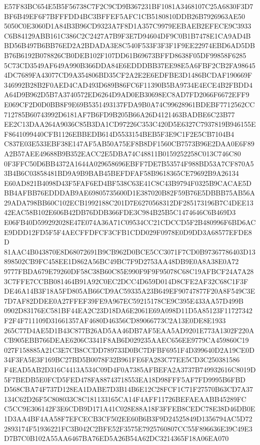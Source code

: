 \documentclass[UTF8,fontset=fandol,zihao=-4,a4paper]{ctexart}
\begin{document}
{{E57F83BC654E5B5F56738C7F2C9CD9B367231BF1081A3468107C25A6830F3D7BF6B49EF6F7BFFFDD4BC3BFFEF5AFC1CB5180810DDB26B7926963AE50
5050C0E3060D1A84B3B96CD9323A7F8D1A357C9979EEBAEB2EFECE9C3933C6B84129ABB161C386C2C2427A7B9F3E7D94604DF9C0B1B7478E1CA9AD4B
BD56B497B6BB76ED2A2BDADA3E8C540F533F3F3F1F9EE22974EBD6AD5DBB76B6192B078826CB0DEB102F107DD61B69673BFFD8638F05DF99858F6285
5C73CD3549AF649A990B366DDA84E6EDDDBB37EE98E5A6FBF2CB2FA986454DC7689FA43077CD9A354806BD35CF2A2E2E6EDFBE3D1486BCDAF190669F
346992B28B2F0AED4CAD493D689B86FC6F11390B5BA9734E4ECE4B2FBDD4A64D9B962D5B7A3740572ED6264D9AD0EB30698EC8AD7FD2066F6672EFF9
E069CF2D0D0BB8F9E69B5351493137FDA9B0A74C99628961BDEBF7712562CC712785B60743992D6181AF7B6FD9B205B66A26D4121463BADBE6C23B77
EE2C13DAA264A9036C85B3DA1CD97226C353C420D5E6327C7937819B946155EF8641099440CFB1126EBBEDB614D5533154BEB5F3E9C1F2E5CB7104B4
C837E03E533EBF38E147AF5AB50A75EF8B8DF1560CB7573B96E2DAA0E6F89A2B57AEE49688B9B352EACC2E5DBA74C48811B0159252258C013C746C80
0F3FFC50D6BB4372A1644A029658696EBFF7DE7B53574F988BD53A7CF870A53B4B6C03858481BD9A9B9BAB45BEFDFAF58B9618365CE79692B9A26134
E60AD821B4098D43F5FAF6ED4BF538C63E41C8C43B9794F0325B9CACAE5DBB4AFBB76EDDDAB9AE69805735600D1E387020B82F59B76E5DBBB75AB56A
29ADA798BB60C102ECB1992188C201D7E6270568312DF285173196B7C4DEE1342EAC58B102E606B42DB76DDB366FDE3C984B25B5C1474646C6B469D3
E06FB40D599292028E47E074A36A71C09534CC21CDCCD5F2B480996F6BD6ACE9DDD12FD5F5F4AECFFDFCF3CFB1CDD029F0978E0D9DD3A68577EFDE8D
81AAC4B043870E8D68072691B9CB962D0BCE5CC3071F7CD0B97367786403D13898502CB9FC458EE1D862A56BC49BC7F9D2753AA48DB9E0A8A38E0A72
9777FBDA679E79260DF58C38B60C85E990F9F9F95078C68C19AFBCF24A7A283C7FFE7CCBB081464B91A92C0EC2DCC4D659D014D8CFE2AF32C68C1F3F
DE46A14B3F18A5FD805AB66CD9AC59335A23B649EF90747877F20A8F549C3E7D7AF82DDEE0A27FFEF39FE9A967EC59215178CE9C395E433AA57D499B
0902D83176EC581BF44EA2C23D18DA6E2061E69A098D11D5A85123F11727342F2F4F711109D31661357AF4680D46356CD89066773C2A13E0DE8E1933
265C77D4AE5D1B43C877B26AD5AA46DB7AF5EAA5AD9201E773A1302F220ACB905EBB766DEAE6206C3341F8AB6D029235AAEC656EE9779CA459860C19
027F158885A21C3E7CB8CCDD789733D0BC7DFBF6951F4D399640D2A19CE0D34F3FA5E3F169BC27BD5B0078F32B961FE6FA283C77EE5CD3C250381586
F4EAD5AB2D316C4413A534C09D4F0A7385AFBEFA2A3737B749932616C8019D5F7BEDB5E0FCD5FED478FA88743718553EA18D98FFF5AF7FD9995B6FBD
D568CBA74F737D128EA1DABE7D3B14B6E12C28FCF1C71F27570B63CD7A37134C62D26F5C808033C8C181133165CA14F4AFF11726BEFAEAABB45289FC
C5CC9E306142F3E6CDB9D171A41C028E88A18F3FFEB8CEDC78E38D46DB0E1D3AA4BF4AA58F7EFCECB3CF502EE60B6B3F9D24525849D1356794AC5D72
2893174F51936221FC3B042C2BFE52F3575E7925760807CC55F896636E39C49E3D7B7C0B102A55AA6467BA76ED5A26B54A62DC3214365F18A06EA070
}}
\end{document}

